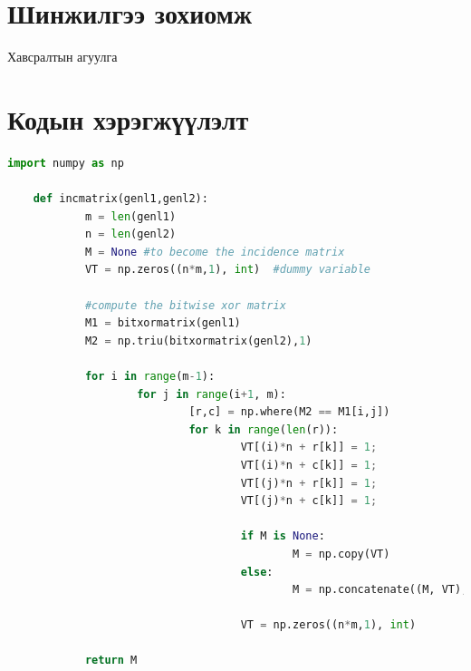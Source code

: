 \documentclass[12pt,A4]{report}
\begin{document}
\appendix
{}

\chapter{Шинжилгээ зохиомж}
Хавсралтын агуулга

\chapter{Кодын хэрэгжүүлэлт}

\begin{lstlisting}[language=Python]
	import numpy as np
	 
	def incmatrix(genl1,genl2):
			m = len(genl1)
			n = len(genl2)
			M = None #to become the incidence matrix
			VT = np.zeros((n*m,1), int)  #dummy variable
	 
			#compute the bitwise xor matrix
			M1 = bitxormatrix(genl1)
			M2 = np.triu(bitxormatrix(genl2),1) 
	 
			for i in range(m-1):
					for j in range(i+1, m):
							[r,c] = np.where(M2 == M1[i,j])
							for k in range(len(r)):
									VT[(i)*n + r[k]] = 1;
									VT[(i)*n + c[k]] = 1;
									VT[(j)*n + r[k]] = 1;
									VT[(j)*n + c[k]] = 1;
	 
									if M is None:
											M = np.copy(VT)
									else:
											M = np.concatenate((M, VT), 1)
	 
									VT = np.zeros((n*m,1), int)
	 
			return M
	\end{lstlisting}
\end{document}
